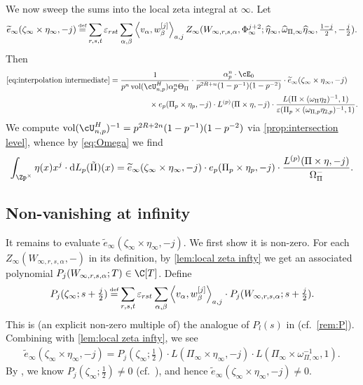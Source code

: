 \documentclass[10pt,reqno,a4paper]{amsart}
\newcommand{\Poref}{\tilde\Pi}
\newcommand{\omegahat}{\widehat{\omega}}
\newcommand{\etahat}{\widehat{\eta}}
\begin{document}
We now sweep the sums into the local zeta integral at $\infty$. Let
\[
\widetilde{e}_\infty(\zeta_\infty \times \eta_\infty, -j)\defeq \sum_{r,s,t}\varepsilon_{rst}\sum_{\alpha,\beta}\left\langle v_\alpha, w_\beta^{[j]}\right\rangle_{a,j} Z_\infty(W_{\infty, r,s,\alpha}, \Phi_\infty^{j+2}; \etahat_\infty,\omegahat_{\Pi,\infty}\etahat_\infty,\tfrac{1-j}{2},-\tfrac{j}{2}).
\]
 Then
\begin{align}
\eqref{eq:interpolation intermediate} &=  \frac{1 }{p^{n}\operatorname{vol}(\cU_{n,p}^H)\alpha_{p}^n  \Theta_\Pi}  \cdot 	\frac{\alpha_p^n \cdot \cE_0 }{p^{2R + n}(1 - p^{-1})(1 - p^{-2})}  \cdot \widetilde{e}_\infty(\zeta_\infty \times \eta_\infty,-j) \\
&\hspace{50pt} \times e_p(\Pi_p \times \eta_{p}, -j) \cdot L^{(p)}(\Pi \times \eta, -j) \cdot \frac{L(\Pi \times (\omega_{\Pi}\eta_2)^{-1}, 1)}{\varepsilon(\Pi_p \times (\omega_{\Pi,p}\eta_{2,p})^{-1},1)}.\notag
\end{align}
We compute $\mathrm{vol}(\cU_{n,p}^H)^{-1} = p^{2R+2n}(1-p^{-1})(1-p^{-2})$ via \cref{prop:intersection level}, whence by \eqref{eq:Omega} we find
\begin{equation} \label{eq:interpolation intermediate 2}
\int_{\Zp^\times} \eta(x)x^{j} \cdot \mathrm{d}L_p(\Poref)(x)  =
\widetilde{e}_\infty(\zeta_\infty \times \eta_\infty,-j) \cdot e_p(\Pi_p \times \eta_{p}, -j)\cdot \frac{L^{(p)}(\Pi \times \eta, -j)}{\Omega_\Pi^-}.
\end{equation}


\subsection{Non-vanishing at infinity}
It remains to evaluate $\widetilde{e}_\infty(\zeta_\infty \times \eta_\infty,-j)$. We first show it is non-zero. For each $Z_\infty(W_{\infty,r,s,\alpha},-)$ in its definition, by \cref{lem:local zeta infty} we get an associated polynomial $P_j(W_{\infty,r,s,\alpha};T) \in \C[T]$. Define
\[
P_j(\zeta_\infty;s+\tfrac{j}{2}) \defeq \sum_{r,s,t}\varepsilon_{rst}\sum_{\alpha,\beta}\left\langle v_\alpha, w_\beta^{[j]}\right\rangle_{a,j} \cdot P_j(W_{\infty,r,s,\alpha};s + \tfrac{j}{2}).
\]
This is (an explicit non-zero multiple of) the analogue of $P_l(s)$ in \cite[(3.1)]{Mah00} (cf.\ \cref{rem:P}). Combining with \cref{lem:local zeta infty}, we see
\begin{align*}
\widetilde{e}_\infty(\zeta_\infty \times \eta_\infty,-j) =  P_j(\zeta_\infty; \tfrac{1}{2}) \cdot  L(\Pi_\infty \times \eta_\infty, -j)\cdot  L(\Pi_\infty \times \omega_{\Pi,\infty}^{-1}, 1).
\end{align*}
By \cite{KS13}, we know $P_j(\zeta_\infty; \tfrac{1}{2}) \neq 0$ (cf.\ \cite[Thm.\ 2.1]{Ger15}), and hence $\widetilde{e}_\infty(\zeta_\infty \times \eta_\infty,-j) \neq 0$.
\end{document}
